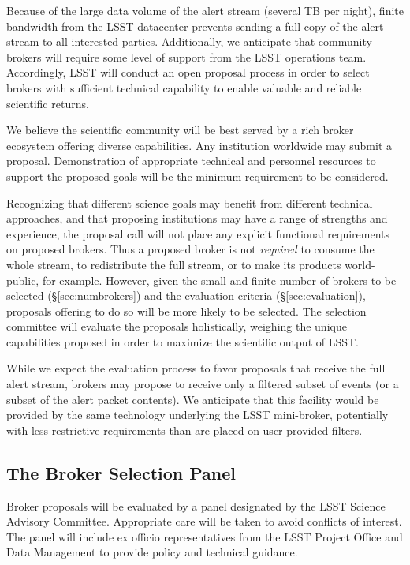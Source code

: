 Because of the large data volume of the alert stream (several TB per night), finite bandwidth from the LSST datacenter prevents sending a full copy of the alert stream to all interested parties.
Additionally, we anticipate that community brokers will require some level of support from the LSST operations team.
Accordingly, LSST will conduct an open proposal process in order to select brokers with sufficient technical capability to enable valuable and reliable scientific returns.

We believe the scientific community will be best served by a rich broker ecosystem offering diverse capabilities. 
Any institution worldwide may submit a proposal.
Demonstration of appropriate technical and personnel resources to support the proposed goals will be the minimum requirement to be considered.

Recognizing that different science goals may benefit from different technical approaches, and that proposing institutions may have a range of strengths and experience, the proposal call will not place any explicit functional requirements on proposed brokers.  
Thus a proposed broker is not \textit{required} to consume the whole stream, to redistribute the full stream, or to make its products world-public, for example.
However, given the small and finite number of brokers to be selected (\S \ref{sec:numbrokers}) and the evaluation criteria (\S \ref{sec:evaluation}), proposals offering to do so will be more likely to be selected.
The selection committee will evaluate the proposals holistically, weighing the unique capabilities proposed in order to maximize the scientific output of LSST.

While we expect the evaluation process to favor proposals that receive the full alert stream, brokers may propose to receive only a filtered subset of events (or a subset of the alert packet contents).  
We anticipate that this facility would be provided by the same technology underlying the LSST mini-broker, potentially with less restrictive requirements than are placed on user-provided filters. 

\subsection{The Broker Selection Panel}

Broker proposals will be evaluated by a panel designated by the LSST Science Advisory Committee.  Appropriate care will be taken to avoid conflicts of interest.
The panel will include ex officio representatives from the LSST Project Office and Data Management to provide policy and technical guidance.

